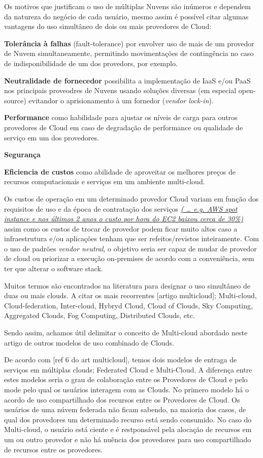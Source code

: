 \documentclass[12pt]{article}
\begin{document}
	Os motivos que justificam o uso de múltiplas Nuvens são inúmeros e dependem da natureza do negócio de cada usuário, mesmo assim é possível citar algumas vantagens do uso simultâneo de dois ou mais provedores de Cloud:
	
	\textbf{Tolerância à falhas} (fault-tolerance) por envolver uso de mais de um provedor de Nuvem simultaneamente, permitindo movimentações de contingência no caso de indisponibilidade de um dos provedors, por exemplo.
	
	\textbf{Neutralidade de fornecedor} possibilita a implementação de IaaS e/ou PaaS nos principais proveodres de Nuvens usando soluções diversas (em especial open-source)  evitandor o aprisionamento à um fornedor (\textit{vendor lock-in}).
	
	\textbf{Performance} como habilidade para ajustar os níveis de carga para outros provedores de Cloud em caso de degradação de performance ou qualidade de serviço em um dos provedores.
	
	\textbf{Segurança}
	
	\textbf{Eficiencia de custos} como abilidade de aproveitar os melhores preços de recursos computacionais e serviços em um ambiente multi-cloud.
	
	Os custos de operação em um determinado provedor Cloud variam em função dos requisitos de uso e da época de contratação dos serviços \textit{\underline{( … e.g. AWS spot instance e nos últimos 2 anos o custo por hora do EC2 baixou cerca de 30\%)}} assim como os custos de trocar de provedor podem ficar muito altos caso a infraestrutura e/ou aplicações tenham que ser refeitos/revistos inteiramente. Com o uso de padrões \textit{vendor neutral}, o objetivo seria ser capaz de mudar de provedor de cloud ou priorizar a execução on-premises de acordo com a conveniência, sem ter que alterar o software stack.
	
	Muitos termos são encontrados na literatura para designar o uso simultâneo de duas ou mais clouds. A citar os mais recorrentes [artigo multicloud]; Multi-cloud, Cloud-federation, Inter-cloud, Hybryd Cloud, Cloud of Clouds, Sky Computing, Aggregated Clouds, Fog Computing, Distributed Clouds, etc.
	
	Sendo assim, achamos útil delimitar o conceito de Multi-cloud abordado neste artigo de outros modelos de uso combinado de Clouds.
	
	De acordo com [ref 6 do art multicloud], temos dois modelos de entraga de serviços em múltiplas clouds; Federated Cloud e Multi-Cloud. A diferença entre estes modelos seria o grau de colaboração entre os Provedores de Cloud e pelo mode pelo qual os usuários interagem com as Clouds. No primero modelo há o acordo de uso compartilhado dos recursos entre os Provedores de Cloud. Os usuários de uma núvem federada não ficam sabendo, na maioria dos casos, de qual dos provedores um determinado recurso está sendo consumido. No caso do Multi-cloud, o usuário está ciente e é restponsável pela alocação de recursos em um ou outro provedor e não há nuência dos provedores para uso compartilhado de recursos entre os provedores.
	
\end{document}

